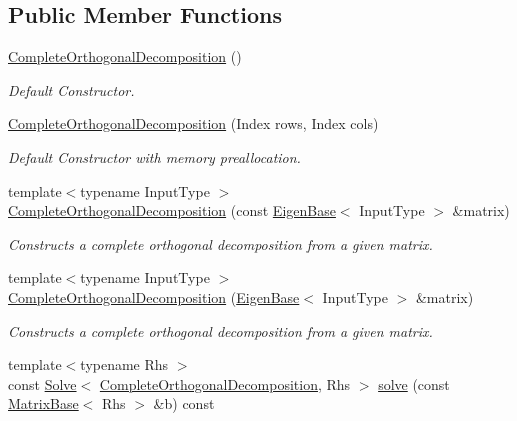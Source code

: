 \subsection*{Public Member Functions}
\begin{DoxyCompactItemize}
\item 
\mbox{\hyperlink{class_eigen_1_1_complete_orthogonal_decomposition_a7ba33814fd3fdc62f6179cdcd655c679}{Complete\+Orthogonal\+Decomposition}} ()
\begin{DoxyCompactList}\small\item\em Default Constructor. \end{DoxyCompactList}\item 
\mbox{\hyperlink{class_eigen_1_1_complete_orthogonal_decomposition_aa6c282dd7452ebe754024edb71bebd09}{Complete\+Orthogonal\+Decomposition}} (Index rows, Index cols)
\begin{DoxyCompactList}\small\item\em Default Constructor with memory preallocation. \end{DoxyCompactList}\item 
{\footnotesize template$<$typename Input\+Type $>$ }\\\mbox{\hyperlink{class_eigen_1_1_complete_orthogonal_decomposition_afcfaf7a395f853247c23bb52b1ffb1cc}{Complete\+Orthogonal\+Decomposition}} (const \mbox{\hyperlink{struct_eigen_1_1_eigen_base}{Eigen\+Base}}$<$ Input\+Type $>$ \&matrix)
\begin{DoxyCompactList}\small\item\em Constructs a complete orthogonal decomposition from a given matrix. \end{DoxyCompactList}\item 
{\footnotesize template$<$typename Input\+Type $>$ }\\\mbox{\hyperlink{class_eigen_1_1_complete_orthogonal_decomposition_a082295ba2aac35a8b8b9e2d46e1d7ce4}{Complete\+Orthogonal\+Decomposition}} (\mbox{\hyperlink{struct_eigen_1_1_eigen_base}{Eigen\+Base}}$<$ Input\+Type $>$ \&matrix)
\begin{DoxyCompactList}\small\item\em Constructs a complete orthogonal decomposition from a given matrix. \end{DoxyCompactList}\item 
{\footnotesize template$<$typename Rhs $>$ }\\const \mbox{\hyperlink{class_eigen_1_1_solve}{Solve}}$<$ \mbox{\hyperlink{class_eigen_1_1_complete_orthogonal_decomposition}{Complete\+Orthogonal\+Decomposition}}, Rhs $>$ \mbox{\hyperlink{class_eigen_1_1_complete_orthogonal_decomposition_ab303e177cc7df17e435c79dca9ef5654}{solve}} (const \mbox{\hyperlink{class_eigen_1_1_matrix_base}{Matrix\+Base}}$<$ Rhs $>$ \&b) const

\end{DoxyCompactItemize}
